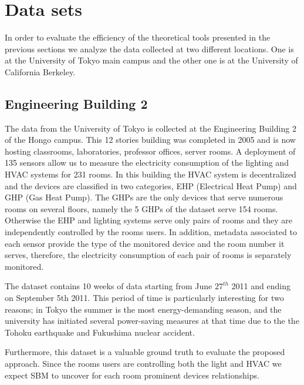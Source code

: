 \section{Data sets}
In order to evaluate the efficiency of the theoretical tools presented in the previous sections we analyze the data collected at two different locations.
One is at the University of Tokyo main campus and the other one is at the University of California Berkeley.

\subsection{Engineering Building 2} \label{data:engbldg2}
The data from the University of Tokyo is collected at the Engineering Building 2 of the Hongo campus. 
This 12 stories building was completed in 2005 and is now hosting classrooms, laboratories, professor offices, server rooms.
A deployment of 135 sensors allow us to measure the electricity consumption of the lighting and HVAC systems for 231 rooms.
In this building the HVAC system is decentralized and the devices are classified in two categories, EHP (Electrical Heat Pump) and GHP (Gas Heat Pump).
The GHPs are the only devices that serve numerous rooms on several floors, namely the 5 GHPs of the dataset serve 154 rooms.
Otherwise the EHP and lighting systems serve only pairs of rooms and they are independently controlled by the rooms users.
In addition, metadata associated to each sensor provide the type of the monitored device and the room number it serves, therefore, the electricity consumption of each pair of rooms is separately monitored.

The dataset contains 10 weeks of data starting from June $27^{th}$ 2011 and ending on September 5th 2011.
This period of time is particularly interesting for two reasons; in Tokyo the summer is the most energy-demanding season, and the university has initiated several power-saving measures at that time due to the the Tohoku earthquake and Fukushima nuclear accident.

Furthermore, this dataset is a valuable ground truth to evaluate the proposed approach.
Since the rooms users are controlling both the light and HVAC we expect SBM to uncover for each room prominent devices relationships.

